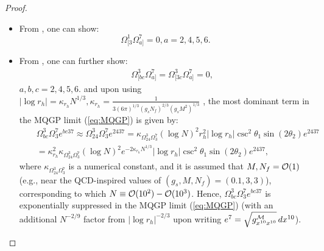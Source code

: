 \documentclass[a4paper,11pt,fleqn]{article}
\theoremstyle{plain}
\theoremstyle{definition}
\begin{document}
\begin{proof}
\begin{itemize}
\item From \cite{ACMS}, one can show:
\begin{equation}
\label{Omega13Omega7aantisymm}
\Omega^1_{[3}\Omega^7_{a]} = 0, a= 2, 4, 5, 6.
\end{equation}
\item
From \cite{ACMS}, one can further show:
\begin{eqnarray}
\label{Omega3bcOmega7aantisymm}
& & \Omega^3_{[bc}\Omega^7_{a]} = \Omega^3_{[3c}\Omega^7_{a]} = 0,     
\end{eqnarray}
$a, b, c = 2, 4, 5, 6$.
and upon using $|\log r_h|=\kappa_{r_h}N^{1/3}, \kappa_{r_h}=\frac{1}{3(6\pi)^{1/3}\left(g_s N_f\right)^{2/3}\left(g_s M^2\right)^{1/3}}$ \cite{IITR-McGill-bulk-viscosity}, the most dominant term in the MQGP limit (\ref{eq:MQGP}) is given by:
\begin{eqnarray}
\label{Omega3bcOmega73antisymm}
& & \Omega^3_{bc}\Omega^7_{3} e^{bc37}\approx \Omega^3_{24}\Omega^7_3 e^{2437} =  \kappa_{\Omega^3_{24}\Omega^7_{3}}\left(\log N\right)^2 r_h^2|\log r_h|\csc^2\theta_1 \sin(2\theta_2)e^{2437}\nonumber\\
& & = \kappa_{r_h}^2 \kappa_{\Omega^3_{24}\Omega^7_{3}}\left(\log N\right)^2 e^{-2\kappa_{r_h}N^{1/3}}|\log r_h|\csc^2\theta_1 \sin(2\theta_2)e^{2437},
\end{eqnarray}
where $\kappa_{\Omega^3_{24}\Omega^7_{3}}$ is a numerical constant, and it is assumed that $M, N_f = {\cal O}(1)$ (e.g., near the QCD-inspired values of $(g_s, M, N_f) = (0.1, 3, 3)$), corresponding to which $N\equiv {\cal O}(10^2) - {\cal O}(10^3)$. Hence, $\Omega^3_{bc}\Omega^7_{3} e^{bc37}$ is exponentially suppressed in the MQGP limit (\ref{eq:MQGP}) (with an additional $N^{-2/9}$ factor from $|\log r_h|^{-2/3}$ upon writing $e^{7}=\sqrt{g^{\cal M}_{x^{10}x^{10}}}\,dx^{10}$).


\end{itemize}
\end{proof}
\end{document}
